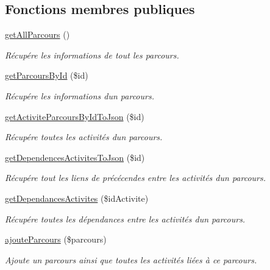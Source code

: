 \subsection*{Fonctions membres publiques}
\begin{DoxyCompactItemize}
\item 
\hyperlink{class_m___parcours_ae550e9d7d995ac5b58d7613d74c1d248}{get\+All\+Parcours} ()
\begin{DoxyCompactList}\small\item\em Récupére les informations de tout les parcours. \end{DoxyCompactList}\item 
\hyperlink{class_m___parcours_a23eb09937940c4ec4432532459b076f0}{get\+Parcours\+By\+Id} (\$id)
\begin{DoxyCompactList}\small\item\em Récupére les informations d\textquotesingle{}un parcours. \end{DoxyCompactList}\item 
\hyperlink{class_m___parcours_a8327d770151bc091fc57c433ba55d2d3}{get\+Activite\+Parcours\+By\+Id\+To\+Json} (\$id)
\begin{DoxyCompactList}\small\item\em Récupére toutes les activités d\textquotesingle{}un parcours. \end{DoxyCompactList}\item 
\hyperlink{class_m___parcours_a4dee8684553fce58a3797b4dcd8461ed}{get\+Dependences\+Activites\+To\+Json} (\$id)
\begin{DoxyCompactList}\small\item\em Récupére tout les liens de précécendes entre les activités d\textquotesingle{}un parcours. \end{DoxyCompactList}\item 
\hyperlink{class_m___parcours_ac5b350eeb8ba4a1da8119e830b4b945a}{get\+Dependances\+Activites} (\$id\+Activite)
\begin{DoxyCompactList}\small\item\em Récupére toutes les dépendances entre les activités d\textquotesingle{}un parcours. \end{DoxyCompactList}\item 
\hyperlink{class_m___parcours_a898f1da8fda950ebdc6cd0f98ecacc2a}{ajoute\+Parcours} (\$parcours)
\begin{DoxyCompactList}\small\item\em Ajoute un parcours ainsi que toutes les activités liées à ce parcours. \end{DoxyCompactList}\item 

\end{DoxyCompactItemize}
